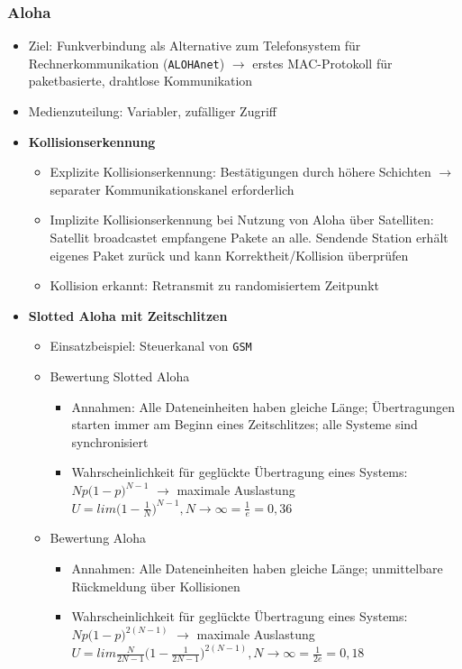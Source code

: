 \subsubsection{Aloha}
\begin{itemize}
	\item Ziel: Funkverbindung als Alternative zum Telefonsystem für Rechnerkommunikation (\texttt{ALOHAnet}) \(\rightarrow\) erstes MAC-Protokoll für paketbasierte, drahtlose Kommunikation
	\item Medienzuteilung: Variabler, zufälliger Zugriff
	\item \textbf{Kollisionserkennung}
	\begin{itemize}
		\item Explizite Kollisionserkennung: Bestätigungen durch höhere Schichten \(\rightarrow\) separater Kommunikationskanel erforderlich
		\item Implizite Kollisionserkennung bei Nutzung von Aloha über Satelliten: Satellit broadcastet empfangene Pakete an alle. Sendende Station erhält eigenes Paket zurück und kann Korrektheit/Kollision überprüfen
		\item Kollision erkannt: Retransmit zu randomisiertem Zeitpunkt
	\end{itemize}
	\item \textbf{Slotted Aloha mit Zeitschlitzen}
	\begin{itemize}
		\item Einsatzbeispiel: Steuerkanal von \texttt{GSM}
		\item Bewertung Slotted Aloha
		\begin{itemize}
			\item Annahmen: Alle Dateneinheiten haben gleiche Länge; Übertragungen starten immer am Beginn eines Zeitschlitzes; alle Systeme sind synchronisiert
			\item Wahrscheinlichkeit für geglückte Übertragung eines Systems: \(Np\big(1-p\big)^{N-1}\) \(\rightarrow\) maximale Auslastung \(U=lim \big(1-\frac{1}{N}\big)^{N-1}, N \rightarrow \infty = \frac{1}{e} = 0,36\)
		\end{itemize}
		\item Bewertung Aloha
		\begin{itemize}
			\item Annahmen: Alle Dateneinheiten haben gleiche Länge; unmittelbare Rückmeldung über Kollisionen
			\item Wahrscheinlichkeit für geglückte Übertragung eines Systems: \(Np\big(1-p\big)^{2(N-1)}\) \(\rightarrow\) maximale Auslastung \(U=lim \frac{N}{2N-1} \big(1-\frac{1}{2N-1}\big)^{2(N-1)}, N \rightarrow \infty = \frac{1}{2e} = 0,18\)
		\end{itemize}
	\end{itemize}
\end{itemize}

